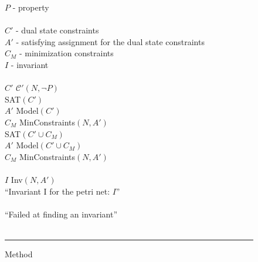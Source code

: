\begin{figure}[t]
\begin{minipage}[t]{.94\columnwidth}
    \tabT $P$ - property \\
    \algVars\\
    \tabT $C'$ - dual state constraints \\
    \tabT $A'$ - satisfying assignment for the dual state constraints \\
    \tabT $C_M$ - minimization constraints \\
    \tabT $I$ - invariant \\
    \algBegin\\
    \tabT $C'$ \algAssgn $\mathcal C'(N, \neg P)$ \\
    \tabT \algIf SAT$(C')$ \algThen \\
    \tabTT $A'$ \algAssgn Model$(C')$ \\
    \tabTT $C_M$ \algAssgn MinConstraints$(N, A')$ \\
    \tabTT \algWhile SAT$(C' \cup C_M)$ \algDo \\
    \tabTTT $A'$ \algAssgn Model$(C' \cup C_M)$ \\
    \tabTTT $C_M$ \algAssgn MinConstraints$(N, A')$ \\
    \tabTT \algOd \\
    \tabTT $I$ \algAssgn Inv$(N, A')$ \\
    \tabTT \algReturn ``Invariant I for the petri net: $I$'' \\
    \tabT \algElse \\
    \tabTT \algReturn ``Failed at finding an invariant'' \\
    \tabT \algFi \\
    \algEnd
  \end{minipage}
  \vspace{1.5ex}
  \hrule
  \caption{Method \invariantwmin}
  \label{fig_function_invariant_with_minimization_pseudocode}
\end{figure}


